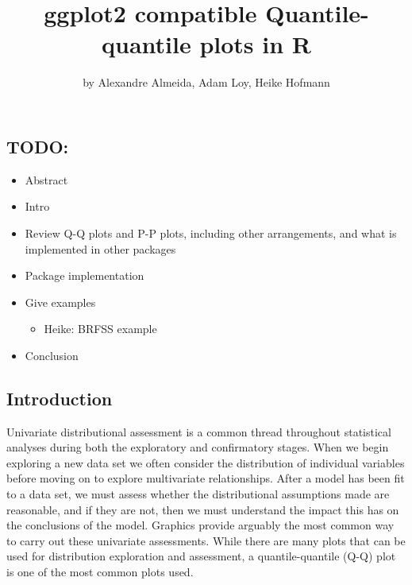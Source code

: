 \title{ggplot2 compatible Quantile-quantile plots in R}
\author{by Alexandre Almeida, Adam Loy, Heike Hofmann}

\maketitle


\newcommand{\hh}[1]{{\textcolor{orange}{#1}}}

\subsection{TODO:}\label{todo}

\begin{itemize}
\tightlist
\item
  Abstract
\item
  Intro
\item
  Review Q-Q plots and P-P plots, including other arrangements, and what
  is implemented in other packages
\item
  Package implementation
\item
  Give examples

  \begin{itemize}
  \tightlist
  \item
    Heike: BRFSS example
  \end{itemize}
\item
  Conclusion
\end{itemize}

\subsection{Introduction}\label{introduction}

\label{sec:introduction}

Univariate distributional assessment is a common thread throughout
statistical analyses during both the exploratory and confirmatory
stages. When we begin exploring a new data set we often consider the
distribution of individual variables before moving on to explore
multivariate relationships. After a model has been fit to a data set, we
must assess whether the distributional assumptions made are reasonable,
and if they are not, then we must understand the impact this has on the
conclusions of the model. Graphics provide arguably the most common way
to carry out these univariate assessments. While there are many plots
that can be used for distribution exploration and assessment, a
quantile-quantile (Q-Q) plot \citep{Wilk1968-ii} is one of the most
common plots used.

